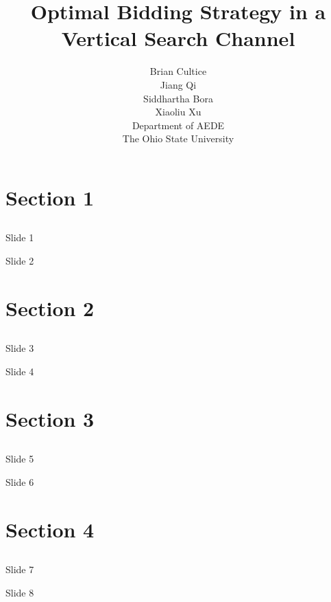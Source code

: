 \documentclass[font=10 pt]{beamer}
\title[Optimal Bid Strategy]{Optimal Bidding Strategy in a Vertical Search Channel}  %
\date[\today]{}
\author[Bora, Cultice, Qi, Xu]{{\footnotesize Brian Cultice\\
Jiang Qi\\
Siddhartha Bora \\
Xiaoliu Xu\\
Department of AEDE\\
The Ohio State University}}
\institute[]{{\footnotesize Erdos Institute Python Bootcamp \\
\today}}
\begin{document}
\begin{frame}
\titlepage %
\end{frame}

\section{Section 1}
\subsection{}

\begin{frame}{Slide 1}

\end{frame}

\begin{frame}{Slide 2}

\end{frame}

\section{Section 2}
\subsection{}

\begin{frame}{Slide 3}

\end{frame}

\begin{frame}{Slide 4}

\end{frame}

\section{Section 3}
\subsection{}

\begin{frame}{Slide 5}

\end{frame}

\begin{frame}{Slide 6}

\end{frame}
\section{Section 4}
\subsection{}

\begin{frame}{Slide 7}

\end{frame}

\begin{frame}{Slide 8}

\end{frame}
\end{document}
